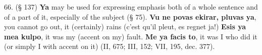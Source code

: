 66. (§ 137) \textbf{Ya} may be used for expressing emphasis both of a whole sentence and of a part of it, especially of the subject (§ 75). \textbf{Vu ne povas ekirar, pluvas ya}, you cannot go out, it (certainly) rains (c'est qu'il pleut, es regnet ja!) \textbf{Esis ya mea kulpo}, it was my (accent on my) fault. \textbf{Me ya facis to}, it was I who did it (or simply I with accent on it) (II, 675; III, 152; VII, 195, dec. 377). %

